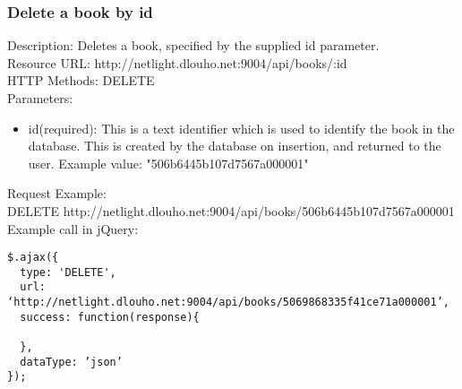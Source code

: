\subsubsection{Delete a book by id}
Description: Deletes a book, specified by the supplied id parameter.	\\
\newline
Resource URL: http://netlight.dlouho.net:9004/api/books/:id 	\\
HTTP Methods: DELETE		\\
Parameters: 			
\begin{itemize}

\item id(required): This is a text identifier which is used to identify the book in the database. This is created by the database on insertion, and returned to the user. Example value: "506b6445b107d7567a000001"

\end{itemize}
Request Example:		\\
DELETE	http://netlight.dlouho.net:9004/api/books/506b6445b107d7567a000001	\\
\newline
Example call in jQuery:
\begin{verbatim}
$.ajax({
  type: 'DELETE',
  url: ‘http://netlight.dlouho.net:9004/api/books/5069868335f41ce71a000001’, 
  success: function(response){
  
  },
  dataType: ’json’
});
\end{verbatim}

